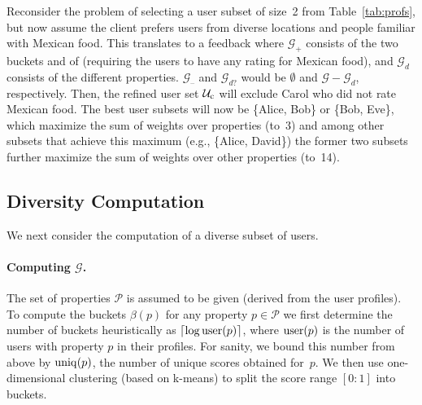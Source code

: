 \begin{example}
	Reconsider the problem of selecting a user subset of size~2 from Table~\ref{tab:profs}, but now assume the client prefers users from diverse locations and people familiar with Mexican food. This translates to a feedback where $\mathcal{G}_{+}$ consists of the two buckets  and  of  (requiring the users to have any rating for Mexican food), and $\mathcal{G}_{d}$ consists of the different  properties. $\mathcal{G}_{\textrm{--}}$ and $\mathcal{G}_{d?}$ would be $\emptyset$ and $\mathcal{G}-\mathcal{G}_d$, respectively. Then, the refined user set $\mathcal{U}_{\operatorname{c}}$ will exclude Carol who did not rate Mexican food. The best user subsets will now be \{Alice, Bob\} or \{Bob, Eve\}, which maximize the sum of weights over  properties (to~3) and among other subsets that achieve this maximum (e.g., \{Alice, David\})  the former two subsets further maximize the sum of weights over other properties (to~14).
\end{example}


\subsection{Diversity Computation}
\label{sec:compute}

We next consider the computation of a diverse subset of users. 

\paragraph*{Computing $\mathcal{G}$.} The set of properties $\mathcal{P}$ is assumed to be given (derived from the user profiles). To compute the buckets $\beta(p)$ for any property $p\in\mathcal{P}$ we first determine the number of buckets heuristically as $\lceil\log\operatorname{user}(p)\rceil$, where $\operatorname{user}(p)$ is the number of users with property $p$ in their profiles. For sanity, we bound this number from above by $\operatorname{uniq}(p)$, the number of unique scores obtained for~$p$. We then use one-dimensional clustering (based on k-means) to split the score range $[0:1]$ into buckets.


